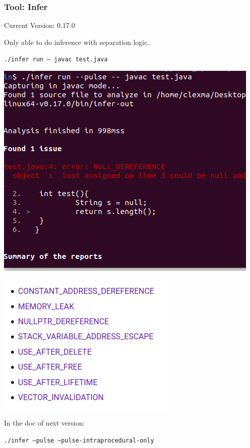\documentclass[11pt]{beamer}
\begin{document}
\begin{frame}\frametitle{Tool: Infer}
Current Version: 0.17.0

Only able to do inference with separation logic.

\texttt{./infer run -- javac test.java}
\begin{multicols}{2}
\begin{center}
\includegraphics[scale=0.3]{result.png}

\includegraphics[scale=0.4]{types.png}
\end{center}
\end{multicols}
In the doc of next version:

\texttt{./infer --pulse --pulse-intraprocedural-only}
\end{frame}
\end{document}
